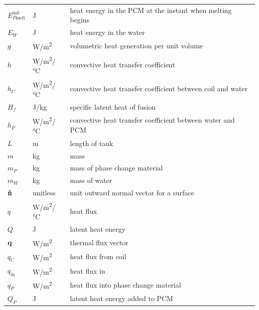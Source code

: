 \documentclass[12pt]{article}
\begin{document}
\begin{longtable*}{l l p{12cm}}
  $E_{P\text{melt}}^\text{init}$ & \si[per-mode=symbol] {\joule} & heat energy
                                                                   in the PCM at
                                                                   the instant
                                                                   when melting begins
  \\ 
  $E_W$ & \si[per-mode=symbol] {\joule} & heat energy in the water
  \\ 
  $g$ & \si[per-mode=symbol] {\watt \per \square \metre} & volumetric heat
  generation per unit volume
  \\
  $h$ & \si[per-mode=symbol] {\watt\per\square\metre\per\celsius} & convective 
  heat transfer coefficient
  \\ 
  $h_C$ & \si[per-mode=symbol] {\watt\per \square \meter\per \celsius} &
  convective heat transfer coefficient between coil and water
  \\
  $H_f$ & \si[per-mode=symbol] {\joule \per \kilogram} & specific latent heat of
  fusion
  \\
  $h_P$ & \si[per-mode=symbol] {\watt \per \square\meter\per\celsius} &
  convective heat transfer coefficient between water and PCM
  \\
  $L$ & \si{\metre} & length of tank
  \\
  $m$ & \si[per-mode=symbol] {\kilo\gram} & mass
  \\
  $m_P$ & \si[per-mode=symbol] {\kilo\gram} & mass of phase change material
  \\
  $m_W$ & \si[per-mode=symbol] {\kilo\gram} & mass of water
  \\
  $\bf{\hat{n}}$ & \si[per-mode=symbol] {unitless} & unit outward normal 
  vector for a surface 
  \\ 
  $q$ & \si[per-mode=symbol] {\watt \per \square \metre \per \celsius} & heat
  flux
  \\
  $Q$ & \si[per-mode=symbol] {\joule} & latent heat energy
  \\
  $\bf{q}$ & \si[per-mode=symbol] {\watt\per\square\metre} & thermal flux vector
  \\
  $q_C$ & \si[per-mode=symbol] {\watt\per\square\metre} & heat flux from coil
  \\
  $q_\text{in}$ & \si[per-mode=symbol] {\watt\per\square\metre} & heat flux in
  \\ 
  $q_P$ & \si[per-mode=symbol] {\watt\per\square\metre} & heat flux into phase
  change material
  \\
  $Q_P$ & \si[per-mode=symbol] {\joule} & latent heat energy added to PCM

\end{longtable*}
\end{document}
